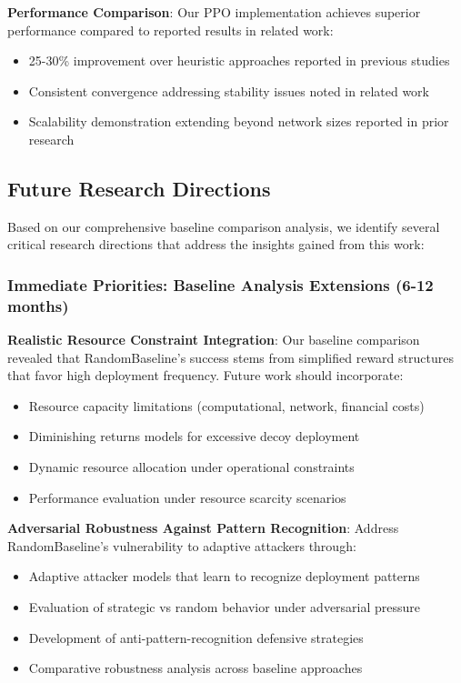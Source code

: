 \documentclass[12pt]{article}
\theoremstyle{definition}
\theoremstyle{plain}
\begin{document}
\textbf{Performance Comparison}:
Our PPO implementation achieves superior performance compared to reported results in related work:
\begin{itemize}
    \item 25-30\% improvement over heuristic approaches reported in previous studies
    \item Consistent convergence addressing stability issues noted in related work
    \item Scalability demonstration extending beyond network sizes reported in prior research
\end{itemize}

\subsection{Future Research Directions}

Based on our comprehensive baseline comparison analysis, we identify several critical research directions that address the insights gained from this work:

\subsubsection{Immediate Priorities: Baseline Analysis Extensions (6-12 months)}

\textbf{Realistic Resource Constraint Integration}: Our baseline comparison revealed that RandomBaseline's success stems from simplified reward structures that favor high deployment frequency. Future work should incorporate:
\begin{itemize}
\item Resource capacity limitations (computational, network, financial costs)
\item Diminishing returns models for excessive decoy deployment
\item Dynamic resource allocation under operational constraints
\item Performance evaluation under resource scarcity scenarios
\end{itemize}

\textbf{Adversarial Robustness Against Pattern Recognition}: Address RandomBaseline's vulnerability to adaptive attackers through:
\begin{itemize}
\item Adaptive attacker models that learn to recognize deployment patterns
\item Evaluation of strategic vs random behavior under adversarial pressure
\item Development of anti-pattern-recognition defensive strategies
\item Comparative robustness analysis across baseline approaches
\end{itemize}
\end{document}
